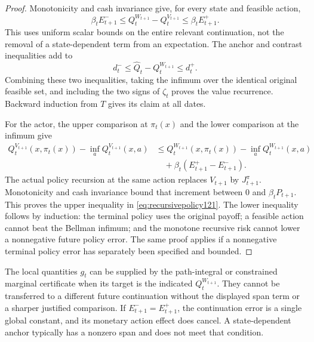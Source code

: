\begin{proof}
Monotonicity and cash invariance give, for every
state and feasible action,
\[
 \beta_tE_{t+1}^-
 \leq Q_t^{W_{t+1}}-Q_t^{V_{t+1}}
 \leq\beta_tE_{t+1}^+.
\]
This uses uniform scalar bounds on the entire
relevant continuation, not the removal of a
state-dependent term from an expectation.
The anchor and contrast inequalities add to
\[
 d_t^-\leq
        \widehat Q_t-Q_t^{W_{t+1}}\leq d_t^+.
\]
Combining these two inequalities, taking the
infimum over the identical original feasible
set, and including the two signs of
\(\zeta_t\) proves the value recurrence.
Backward induction from \(T\) gives its
claim at all dates.

For the actor, the upper comparison at
\(\pi_t(x)\) and the lower comparison at
the infimum give
\begin{align*}
 Q_t^{V_{t+1}}(x,\pi_t(x))
                  -\inf_aQ_t^{V_{t+1}}(x,a)
 &\leq
 Q_t^{W_{t+1}}(x,\pi_t(x))
                  -\inf_aQ_t^{W_{t+1}}(x,a)\\
 &\quad+\beta_t(E_{t+1}^+-E_{t+1}^-).
\end{align*}
The actual policy recursion at the same
action replaces \(V_{t+1}\) by
\(J_{t+1}^\pi\).  Monotonicity and cash
invariance bound that increment between
0 and \(\beta_tP_{t+1}\).
This proves the upper inequality in
\eqref{eq:recursivepolicy121}.
The lower inequality follows by induction:
the terminal policy uses the original
payoff; a feasible action cannot beat the
Bellman infimum; and the monotone
recursive risk cannot lower a
nonnegative future policy error.
The same proof applies if a nonnegative
terminal policy error has separately
been specified and bounded.
\end{proof}

The local quantities \(g_t\) can be supplied
by the path-integral or constrained
marginal certificate when its target is
the indicated \(Q_t^{W_{t+1}}\).
They cannot be transferred to a different
future continuation without the displayed
span term or a sharper justified comparison.
If \(E_{t+1}^-=E_{t+1}^+\), the
continuation error is a single global
constant, and its monetary action effect
does cancel.  A state-dependent anchor
typically has a nonzero span and does not
meet that condition.

